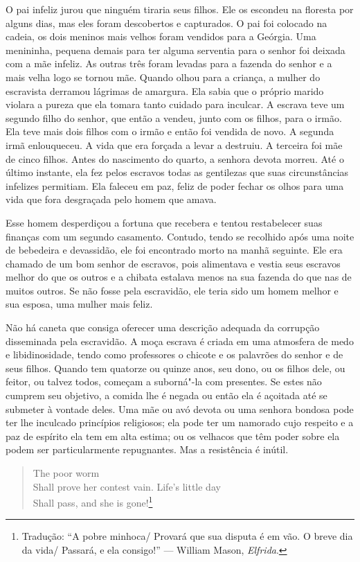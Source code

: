 O pai infeliz jurou que ninguém tiraria seus filhos. Ele os escondeu na
floresta por alguns dias, mas eles foram descobertos e capturados. O pai
foi colocado na cadeia, os dois meninos mais velhos foram vendidos para
a Geórgia. Uma menininha, pequena demais para ter alguma serventia para
o senhor foi deixada com a mãe infeliz. As outras três foram levadas
para a fazenda do senhor e a mais velha logo se tornou mãe. Quando olhou
para a criança, a mulher do escravista derramou lágrimas de amargura.
Ela sabia que o próprio marido violara a pureza que ela tomara tanto
cuidado para inculcar. A escrava teve um segundo filho do senhor, que
então a vendeu, junto com os filhos, para o irmão. Ela teve mais dois
filhos com o irmão e então foi vendida de novo. A segunda irmã
enlouqueceu. A vida que era forçada a levar a destruiu. A terceira foi
mãe de cinco filhos. Antes do nascimento do quarto, a senhora devota
morreu. Até o último instante, ela fez pelos escravos todas as
gentilezas que suas circunstâncias infelizes permitiam. Ela faleceu em
paz, feliz de poder fechar os olhos para uma vida que fora desgraçada
pelo homem que amava.

Esse homem desperdiçou a fortuna que
recebera e tentou restabelecer suas finanças com um segundo casamento.
Contudo, tendo se recolhido após uma noite de bebedeira e devassidão,
ele foi encontrado morto na manhã seguinte. Ele era chamado de um bom
senhor de escravos, pois alimentava e vestia seus escravos melhor do que
os outros e a chibata estalava menos na sua fazenda do que nas de muitos
outros. Se não fosse pela escravidão, ele teria sido um homem melhor e
sua esposa, uma mulher mais feliz.

Não há caneta que consiga oferecer uma
descrição adequada da corrupção disseminada pela escravidão. A moça
escrava é criada em uma atmosfera de medo e libidinosidade, tendo como
professores o chicote e os palavrões do senhor e de seus filhos. Quando
tem quatorze ou quinze anos, seu dono, ou os filhos dele, ou feitor, ou
talvez todos, começam a suborná"-la com presentes. Se estes não cumprem
seu objetivo, a comida lhe é negada ou então ela é açoitada até se
submeter à vontade deles. Uma mãe ou avó devota ou uma senhora bondosa
pode ter lhe inculcado princípios religiosos; ela pode ter um namorado
cujo respeito e a paz de espírito ela tem em alta estima; ou os velhacos
que têm poder sobre ela podem ser particularmente repugnantes. Mas a
resistência é inútil.

\begin{verse}
\quad [\ldots{}] The poor worm\\
Shall prove her contest vain. Life's little day\\
\quad Shall pass, and she is gone!\footnote{Tradução: ``A pobre minhoca/ Provará que
sua disputa é em vão. O breve dia da vida/ Passará, e ela consigo!''
--- William Mason, \emph{Elfrida}.}
\end{verse}

